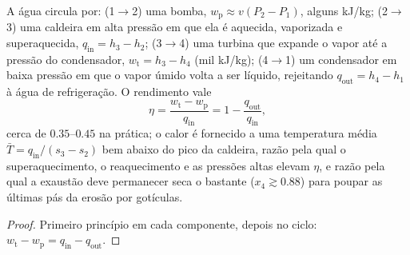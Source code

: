 \begin{proposition}\label{prop:b2:open-systems:rankine}
A água circula por: (1$\to$2) uma bomba, $w_{\text{p}} \approx v(P_2 -
P_1)$, alguns \unit{kJ/kg}; (2$\to$3) uma caldeira em alta pressão em que ela
é aquecida, vaporizada e superaquecida, $q_{\text{in}} = h_3 - h_2$;
(3$\to$4) uma turbina que expande o vapor até a pressão do condensador,
$w_{\text{t}} = h_3 - h_4$ (mil \unit{kJ/kg}); (4$\to$1) um condensador
em baixa pressão em que o vapor úmido volta a ser líquido, rejeitando
$q_{\text{out}} = h_4 - h_1$ à água de refrigeração. O rendimento vale
\[
\eta = \frac{w_{\text{t}} - w_{\text{p}}}{q_{\text{in}}} = 1 - \frac{q_{\text{out}}}{q_{\text{in}}} ,
\]
cerca de $0.35$--$0.45$ na prática; o calor é fornecido a uma
temperatura média $\bar T = q_{\text{in}}/(s_3 - s_2)$ bem abaixo do
pico da caldeira, razão pela qual o superaquecimento, o reaquecimento e as pressões altas elevam
$\eta$, e razão pela qual a exaustão deve permanecer seca o bastante ($x_4 \gtrsim 0.88$) para
poupar as últimas pás da erosão por gotículas.
\end{proposition}

\begin{proof}
Primeiro princípio em cada componente, depois no ciclo: $w_{\text{t}} - w_{\text{p}}
= q_{\text{in}} - q_{\text{out}}$.
\end{proof}

